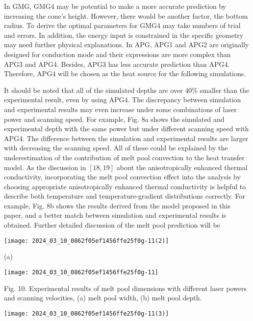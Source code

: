 \documentclass[10pt]{article}
\begin{document}
In GMG, GMG4 may be potential to make a more accurate prediction by increasing the cone's height. However, there would be another factor, the bottom radius. To derive the optimal parameters for GMG4 may take numbers of trial and errors. In addition, the energy input is constrained in the specific geometry may need further physical explanations. In APG, APG1 and APG2 are originally designed for conduction mode and their expressions are more complex than APG3 and APG4. Besides, APG3 has less accurate prediction than APG4. Therefore, APG4 will be chosen as the heat source for the following simulations.

It should be noted that all of the simulated depths are over $40 \%$ smaller than the experimental result, even by using APG4. The discrepancy between simulation and experimental results may even increase under some combinations of laser power and scanning speed. For example, Fig. 8a shows the simulated and experimental depth with the same power but under different scanning speed with APG4. The difference between the simulation and experimental results are larger with decreasing the scanning speed. All of these could be explained by the underestimation of the contribution of melt pool convection to the heat transfer model. As the discussion in $[18,19]$ about the anisotropically enhanced thermal conductivity, incorporating the melt pool convection effect into the analysis by choosing appropriate anisotropically enhanced thermal conductivity is helpful to describe both temperature and temperature-gradient distributions correctly. For example, Fig. 8b shows the results derived from the model proposed in this paper, and a better match between simulation and experimental results is obtained. Further detailed discussion of the melt pool prediction will be

\begin{center}
\texttt{[image: 2024\_03\_10\_0862f05ef1456ffe25f0g-11(2)]}
\end{center}

(a)

\begin{center}
\texttt{[image: 2024\_03\_10\_0862f05ef1456ffe25f0g-11]}
\end{center}

Fig. 10. Experimental results of melt pool dimensions with different laser powers and scanning velocities, (a) melt pool width, (b) melt pool depth.

\begin{center}
\texttt{[image: 2024\_03\_10\_0862f05ef1456ffe25f0g-11(3)]}
\end{center}
\end{document}
